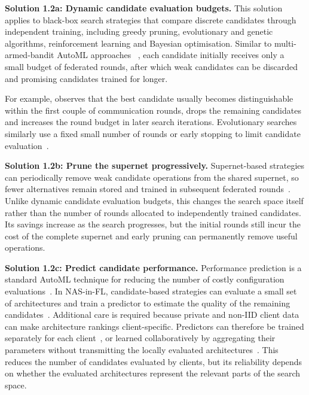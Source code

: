 \noindent\textbf{Solution 1.2a: Dynamic candidate evaluation budgets.} This solution applies to black-box search strategies that compare discrete candidates through independent training, including greedy pruning, evolutionary and genetic algorithms, reinforcement learning and Bayesian optimisation. Similar to multi-armed-bandit AutoML approaches ~\cite{automl_book_hpo_2019}, each candidate initially receives only a small budget of federated rounds, after which weak candidates can be discarded and promising candidates trained for longer.

For example, \cite{decnas_2022,fednas_over_hetero_mobile_devices_2022} observes that the best candidate usually becomes distinguishable within the first couple of communication rounds, drops the remaining candidates and increases the round budget in later search iterations. Evolutionary searches similarly use a fixed small number of rounds or early stopping to limit candidate evaluation~\cite{multi_objective_evo_fl_2020,gpt4-boosted_pso_fednas_2024}.

\noindent\textbf{Solution 1.2b: Prune the supernet progressively.} Supernet-based strategies can periodically remove weak candidate operations from the shared supernet, so fewer alternatives remain stored and trained in subsequent federated rounds~\cite{dfnas_2020,peaches_2024}. Unlike dynamic candidate evaluation budgets, this changes the search space itself rather than the number of rounds allocated to independently trained candidates. Its savings increase as the search progresses, but the initial rounds still incur the cost of the complete supernet and early pruning can permanently remove useful operations.

\noindent\textbf{Solution 1.2c: Predict candidate performance.} Performance prediction is a standard AutoML technique for reducing the number of costly configuration evaluations~\cite{automl_book_hpo_2019}. In NAS-in-FL, candidate-based strategies can evaluate a small set of architectures and train a predictor to estimate the quality of the remaining candidates~\cite{hapfnas_2025,energy_fednas_2025}. Additional care is required because private and non-IID client data can make architecture rankings client-specific. Predictors can therefore be trained separately for each client~\cite{hapfnas_2025}, or learned collaboratively by aggregating their parameters without transmitting the locally evaluated architectures~\cite{federated_bayesian_optimization_nas_2023}. This reduces the number of candidates evaluated by clients, but its reliability depends on whether the evaluated architectures represent the relevant parts of the search space.


